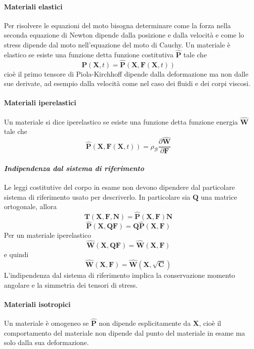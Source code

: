 \paragraph{Materiali elastici}
Per risolvere le equazioni del moto bisogna determinare come la forza nella seconda equazione di Newton dipende dalla posizione e dalla velocità e come lo stress dipende dal moto nell'equazione del moto di Cauchy. 
Un materiale è elastico se esiste una funzione detta funzione costitutiva $\hat{\mathbf{P}}$ tale che
$$\mathbf{P}(\mathbf{X},t)=\hat{\mathbf{P}}(\mathbf{X},\mathbf{F}(\mathbf{X},t)) $$
cioè il primo tensore di Piola-Kirchhoff dipende dalla deformazione ma non dalle sue derivate, ad esempio dalla velocità come nel caso dei fluidi e dei corpi viscosi.
\paragraph{Materiali iperelastici}
Un materiale si dice iperelastico se esiste una funzione detta funzione energia  $\widehat{\mathbf{W}}$ tale che 
$$\widehat{\mathbf{P}}(\mathbf{X},\mathbf{F}(\mathbf{X},t))=\rho_{\mathcal{B}}\frac{\partial \widehat{\mathbf{W}}}{\partial \mathbf{F}} $$
\paragraph{\emph{Indipendenza dal sistema di riferimento}}
Le leggi costitutive del corpo in esame non devono dipendere dal particolare sistema di riferimento usato per descriverlo.
In particolare sia $\mathbf{Q}$ una matrice ortogonale, allora 
$$\mathbf{T}(\mathbf{X},\mathbf{F},\mathbf{N}) = \widehat{\mathbf{P}}(\mathbf{X},\mathbf{F})\mathbf{N} $$
$$\widehat{\mathbf{P}}(\mathbf{X},\mathbf{Q}\mathbf{F}) = \mathbf{Q}\widehat{\mathbf{P}}(\mathbf{X},\mathbf{F}) $$
Per un materiale iperelastico 
$$\widehat{\mathbf{W}}(\mathbf{X},\mathbf{Q}\mathbf{F}) = \widehat{\mathbf{W}}(\mathbf{X},\mathbf{F}) $$
e quindi
$$\widehat{\mathbf{W}}(\mathbf{X},\mathbf{F}) = \widehat{\mathbf{W}}(\mathbf{X},\sqrt{\mathbf{C}}) $$
L'indipendenza dal sistema di riferimento implica la conservazione momento angolare e la simmetria dei tensori di stress.
\paragraph{Materiali isotropici}
Un materiale è omogeneo se $\widehat{\mathbf{P}}$ non dipende esplicitamente da $\mathbf{X}$, cioè il comportamento del materiale non dipende dal punto del materiale in esame ma solo dalla sua deformazione.

